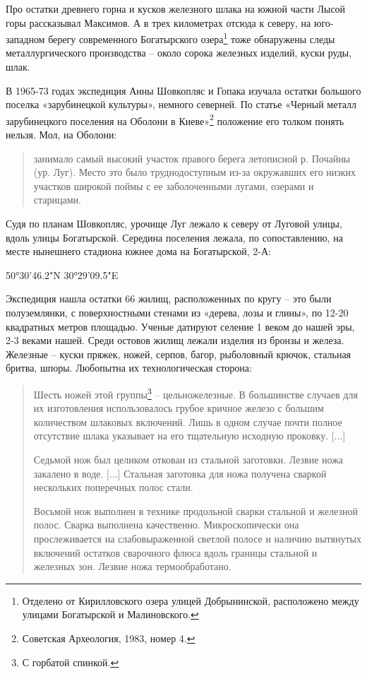 Про остатки древнего горна и кусков железного шлака на южной части Лысой горы рассказывал Максимов. А в трех километрах отсюда к северу, на юго-западном берегу современного Богатырского озера\footnote{Отделено от Кирилловского озера улицей Добрынинской, расположено между улицами Богатырской и Малиновского.} тоже обнаружены следы металлургического производства – около сорока железных изделий, куски руды, шлак.

В 1965-73 годах экспедиция Анны Шовкопляс и Гопака изучала остатки большого поселка «зарубинецкой культуры», немного северней. По статье «Черный металл зарубинецкого поселения на Оболони в Киеве»\footnote{Советская Археология, 1983, номер 4.} положение его толком понять нельзя. Мол, на Оболони: 

\begin{quotation}
занимало самый высокий участок правого берега летописной р. Почайны (ур. Луг). Место это было труднодоступным из-за окружавших его низких участков широкой поймы с ее заболоченными лугами, озерами и старицами.
\end{quotation}
 
Судя по планам Шовкопляс, урочище Луг лежало к северу от Луговой улицы, вдоль улицы Богатырской. Середина поселения лежала, по сопоставлению, на месте нынешнего стадиона южнее дома на Богатырской, 2-А:

50°30'46.2"N 30°29'09.5"E

Экспедиция нашла остатки 66 жилищ, расположенных по кругу – это были полуземлянки, с поверхностными стенами из «дерева, лозы и глины», по 12-20 квадратных метров площадью. Ученые датируют селение 1 веком до нашей эры, 2-3 веками нашей. Среди остовов жилищ лежали изделия из бронзы и железа. Железные – куски пряжек, ножей, серпов, багор, рыболовный крючок, стальная бритва, шпоры. Любопытна их технологическая сторона:

\begin{quotation}
Шесть ножей этой группы\footnote{С горбатой спинкой.} – цельножелезные. В большинстве случаев для их изготовления использовалось грубое кричное железо с большим количеством шлаковых включений. Лишь в одном случае почти полное отсутствие шлака указывает на его тщательную исходную проковку. [...]

Седьмой нож был целиком откован из ста\-льной заготовки. Лезвие ножа закалено в воде. [...] Стальная заготовка для ножа получена сваркой нескольких поперечных полос стали.

Восьмой нож выполнен в технике продольной сварки стальной и железной полос. Сварка выполнена качественно. Микроскопически она прослеживается на слабовыраженной светлой полосе и наличию вытянутых включений остатков сварочного флюса вдоль границы стальной и железных зон. Лезвие ножа термообработано.
\end{quotation}

